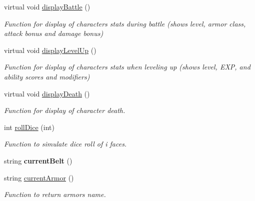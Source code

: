 \begin{DoxyCompactItemize}
virtual void \hyperlink{class_characters_ad40703d40e67cf8d99e4de9624c1ba8a}{display\+Battle} ()
\begin{DoxyCompactList}\small\item\em Function for display of character\textquotesingle{}s stats during battle (shows level, armor class, attack bonus and damage bonus) \end{DoxyCompactList}\item 
\hypertarget{class_characters_a99a811e64beaa78d8d1bd5186199e174}{}\label{class_characters_a99a811e64beaa78d8d1bd5186199e174} 
virtual void \hyperlink{class_characters_a99a811e64beaa78d8d1bd5186199e174}{display\+Level\+Up} ()
\begin{DoxyCompactList}\small\item\em Function for display of character\textquotesingle{}s stats when leveling up (shows level, E\+XP, and ability scores and modifiers) \end{DoxyCompactList}\item 
\hypertarget{class_characters_a021d59a971cf527cb15a3978faa19c63}{}\label{class_characters_a021d59a971cf527cb15a3978faa19c63} 
virtual void \hyperlink{class_characters_a021d59a971cf527cb15a3978faa19c63}{display\+Death} ()
\begin{DoxyCompactList}\small\item\em Function for display of character death. \end{DoxyCompactList}\item 
\hypertarget{class_characters_afa9c56654b160d186ce3fd8259f8f180}{}\label{class_characters_afa9c56654b160d186ce3fd8259f8f180} 
int \hyperlink{class_characters_afa9c56654b160d186ce3fd8259f8f180}{roll\+Dice} (int)
\begin{DoxyCompactList}\small\item\em Function to simulate dice roll of i faces. \end{DoxyCompactList}\item 
\hypertarget{class_characters_ad39fbd976f089a631abc4a7c24de38d6}{}\label{class_characters_ad39fbd976f089a631abc4a7c24de38d6} 
string {\bfseries current\+Belt} ()
\item 
\hypertarget{class_characters_ab2ff7cf1e6a50e005396ac7ff29c6dad}{}\label{class_characters_ab2ff7cf1e6a50e005396ac7ff29c6dad} 
string \hyperlink{class_characters_ab2ff7cf1e6a50e005396ac7ff29c6dad}{current\+Armor} ()
\begin{DoxyCompactList}\small\item\em Function to return armor\textquotesingle{}s name. \end{DoxyCompactList}\item 

\end{DoxyCompactItemize}
